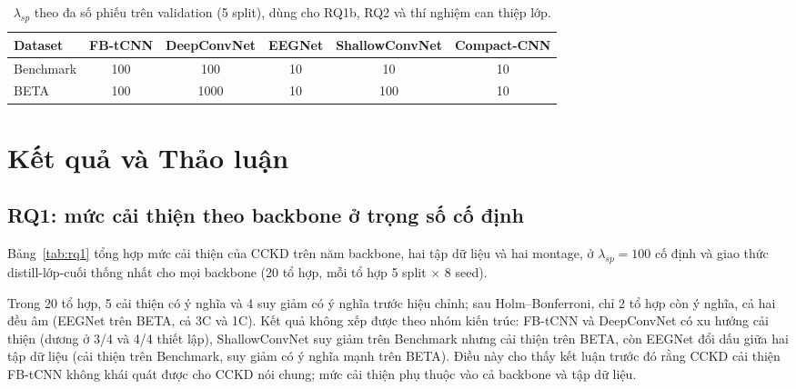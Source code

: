 \documentclass[11pt,a4paper,twoside,asymmetric]{article}
\begin{document}
\begin{table}[htbp]
\caption{$\lambda_{sp}$ theo đa số phiếu trên validation (5 split), dùng cho RQ1b, RQ2 và thí nghiệm can thiệp lớp.}
\label{tab:lambda}
\begin{center}
\begin{tabular}{lccccc}
\toprule
Dataset & FB-tCNN & DeepConvNet & EEGNet & ShallowConvNet & Compact-CNN \\
\midrule
Benchmark & 100 & 100 & 10 & 10 & 10 \\
BETA & 100 & 1000 & 10 & 100 & 10 \\
\bottomrule
\end{tabular}
\end{center}
\end{table}

\section{Kết quả và Thảo luận}

\subsection{RQ1: mức cải thiện theo backbone ở trọng số cố định}
\label{sec:rq1}

Bảng~\ref{tab:rq1} tổng hợp mức cải thiện của CCKD trên năm backbone, hai tập dữ liệu và hai montage, ở $\lambda_{sp}=100$ cố định và giao thức distill-lớp-cuối thống nhất cho mọi backbone (20 tổ hợp, mỗi tổ hợp 5 split $\times$ 8 seed).

Trong 20 tổ hợp, 5 cải thiện có ý nghĩa và 4 suy giảm có ý nghĩa trước hiệu chỉnh; sau Holm--Bonferroni, chỉ 2 tổ hợp còn ý nghĩa, cả hai đều âm (EEGNet trên BETA, cả 3C và 1C). Kết quả không xếp được theo nhóm kiến trúc: FB-tCNN và DeepConvNet có xu hướng cải thiện (dương ở 3/4 và 4/4 thiết lập), ShallowConvNet suy giảm trên Benchmark nhưng cải thiện trên BETA, còn EEGNet đổi dấu giữa hai tập dữ liệu (cải thiện trên Benchmark, suy giảm có ý nghĩa mạnh trên BETA). Điều này cho thấy kết luận trước đó rằng CCKD cải thiện FB-tCNN \cite{R82} không khái quát được cho CCKD nói chung; mức cải thiện phụ thuộc vào cả backbone và tập dữ liệu.
\end{document}
